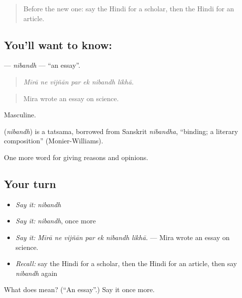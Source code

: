 \begin{quote}
Before the new one: say the Hindi for a scholar, then the Hindi for an article.
\end{quote}

\subsection*{You'll want to know: }
\textbf{} — \emph{nibandh} — \textquotedblleft{}an essay\textquotedblright{}.

\begin{quote}
      
\end{quote}

\begin{quote}
\emph{Mīrā ne vijñān par ek nibandh likhā.}
\end{quote}

\begin{quote}
Mira wrote an essay on science.
\end{quote}

Masculine.

\begin{cousinweb}
\textbf{} (\emph{nibandh}) is a tatsama, borrowed from Sanskrit \emph{nibandha}, \textquotedblleft{}binding; a literary composition\textquotedblright{} (Monier-Williams).
\end{cousinweb}

\begin{grammarlens}[title={What you've built}]
One more word for giving reasons and opinions.
\end{grammarlens}

\subsection*{Your turn}
\begin{itemize}
\raggedright
  \item \emph{Say it:} \emph{nibandh}
  \item \emph{Say it:} \emph{nibandh}, once more
  \item \emph{Say it:} \emph{Mīrā ne vijñān par ek nibandh likhā.} — Mira wrote an essay on science.
  \item \emph{Recall:} say the Hindi for a scholar, then the Hindi for an article, then say \emph{nibandh} again
\end{itemize}

\begin{tcolorbox}[breakable,colback=teal!4,colframe=teal!35!black,title={Before you move on}]
What does  mean? (\textquotedblleft{}An essay\textquotedblright{}.) Say it once more.
\end{tcolorbox}
